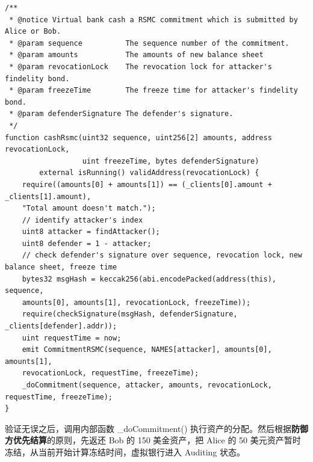 \begin{lstlisting}[caption={兑现RSMC共同承诺}, label={lst:cashRsmc}]
/**
 * @notice Virtual bank cash a RSMC commitment which is submitted by Alice or Bob.
 * @param sequence          The sequence number of the commitment.
 * @param amounts           The amounts of new balance sheet
 * @param revocationLock    The revocation lock for attacker's findelity bond.
 * @param freezeTime        The freeze time for attacker's findelity bond.
 * @param defenderSignature The defender's signature.
 */
function cashRsmc(uint32 sequence, uint256[2] amounts, address revocationLock, 
                  uint freezeTime, bytes defenderSignature) 
        external isRunning() validAddress(revocationLock) {
    require((amounts[0] + amounts[1]) == (_clients[0].amount + _clients[1].amount), 
    "Total amount doesn't match.");
    // identify attacker's index
    uint8 attacker = findAttacker();
    uint8 defender = 1 - attacker;
    // check defender's signature over sequence, revocation lock, new balance sheet, freeze time
    bytes32 msgHash = keccak256(abi.encodePacked(address(this), sequence, 
    amounts[0], amounts[1], revocationLock, freezeTime));
    require(checkSignature(msgHash, defenderSignature, _clients[defender].addr));
    uint requestTime = now;
    emit CommitmentRSMC(sequence, NAMES[attacker], amounts[0], amounts[1], 
    revocationLock, requestTime, freezeTime);
    _doCommitment(sequence, attacker, amounts, revocationLock, requestTime, freezeTime);
}
\end{lstlisting}

验证无误之后，调用内部函数 \_doCommitment() 执行资产的分配。然后根据\textbf{防御方优先结算}的原则，先返还 Bob 的 150 美金资产，把 Alice 的 50 美元资产暂时冻结，从当前开始计算冻结时间，虚拟银行进入 Auditing 状态。

